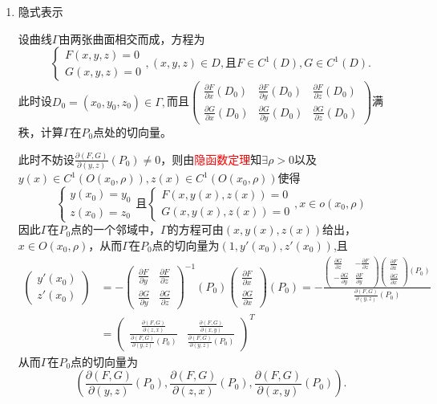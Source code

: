 \documentclass[UTF8]{ctexart}
\newcommand{\p}[2]{\frac{\partial #1}{\partial #2}}
\begin{document}
\begin{enumerate}
        \item 隐式表示
        
        设曲线$\Gamma$由两张曲面相交而成，方程为
        $$\begin{cases}
            F(x,y,z)=0\\
            G(x,y,z)=0
        \end{cases},(x,y,z)\in D,\text{且}F\in C^1(D),G\in C^1(D).$$
        此时设$D_0=(x_0,y_0,z_0)\in\Gamma,$而且$\begin{pmatrix}
            \p{F}{x}(D_0)&\p{F}{y}(D_0)&\p{F}{z}(D_0)\\
            \p{G}{x}(D_0)&\p{G}{y}(D_0)&\p{G}{z}(D_0)
        \end{pmatrix}$满秩，计算$\Gamma$在$P_0$点处的切向量。

        此时不妨设$\p{(F,G)}{(y,z)}(P_0)\not=0$，则由\textcolor{red}{隐函数定理}知$\exists\rho>0$以及$y(x)\in C^1(O(x_0,\rho)),z(x)\in C^1(O(x_0,\rho))$使得$$\begin{cases}
            y(x_0)=y_0\\
            z(x_0)=z_0
        \end{cases}\text{且}\begin{cases}
            F(x,y(x),z(x))=0\\
            G(x,y(x),z(x))=0
        \end{cases},x\in o(x_0,\rho)$$
        因此$\Gamma$在$P_0$点的一个邻域中，$\Gamma$的方程可由$(x,y(x),z(x))$给出，$x\in O(x_0,\rho)$，从而$\Gamma$在$P_0$点的切向量为$(1,y'(x_0),z'(x_0))$,且
        \begin{align*}
            \begin{pmatrix}
                y'(x_0)\\
                z'(x_0)
            \end{pmatrix}&=-\begin{pmatrix}
                \p{F}{y}&\p{F}{z}\\
                \p{G}{y}&\p{G}{z}
            \end{pmatrix}^{-1}(P_0)\begin{pmatrix}
                \p{F}{x}\\
                \p{G}{x}
            \end{pmatrix}(P_0)=-\frac{\begin{pmatrix}
                \p{G}{z}&-\p{F}{z}\\
                -\p{G}{y}&\p{F}{y}
            \end{pmatrix}\begin{pmatrix}
                \p{F}{x}\\
                \p{G}{x}
            \end{pmatrix}(P_0)}{\p{(F,G)}{(y,z)}(P_0)}\\
            &=\begin{pmatrix}
                \frac{\p{(F,G)}{(z,x)}}{\p{(F,G)}{(y,z)}(P_0)}&
                \frac{\p{(F,G)}{(x,y)}}{\p{(F,G)}{(y,z)}(P_0)}
            \end{pmatrix}^T
        \end{align*}
        从而$\Gamma$在$P_0$点的切向量为$$\left(\p{(F,G)}{(y,z)}(P_0),\p{(F,G)}{(z,x)}(P_0),\p{(F,G)}{(x,y)}(P_0)\right).$$


\end{enumerate}
\end{document}
